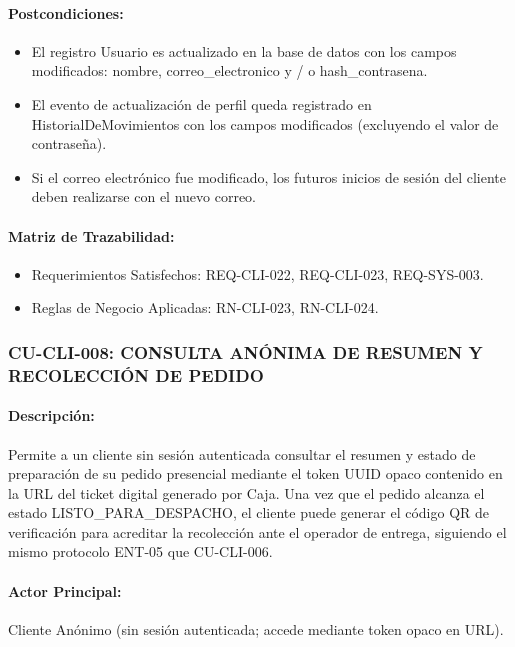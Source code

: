 \paragraph{Postcondiciones:}
\begin{itemize}
    \item El registro Usuario es actualizado en la base de datos con los campos modificados: nombre, correo\_electronico y / o hash\_contrasena.
    \item El evento de actualización de perfil queda registrado en HistorialDeMovimientos con los campos modificados (excluyendo el valor de contraseña).
    \item Si el correo electrónico fue modificado, los futuros inicios de sesión del cliente deben realizarse con el nuevo correo.
\end{itemize}

\paragraph{Matriz de Trazabilidad:}
\begin{itemize}
    \item Requerimientos Satisfechos: REQ-CLI-022, REQ-CLI-023, REQ-SYS-003.
    \item Reglas de Negocio Aplicadas: RN-CLI-023, RN-CLI-024.
\end{itemize}

\subsubsection{CU-CLI-008: CONSULTA ANÓNIMA DE RESUMEN Y RECOLECCIÓN DE PEDIDO}
\paragraph{Descripción:} Permite a un cliente sin sesión autenticada consultar el resumen y estado de preparación de su pedido presencial mediante el token UUID opaco contenido en la URL del ticket digital generado por Caja. Una vez que el pedido alcanza el estado LISTO\_PARA\_DESPACHO, el cliente puede generar el código QR de verificación para acreditar la recolección ante el operador de entrega, siguiendo el mismo protocolo ENT-05 que CU-CLI-006.

\paragraph{Actor Principal:} Cliente Anónimo (sin sesión autenticada; accede mediante token opaco en URL).

